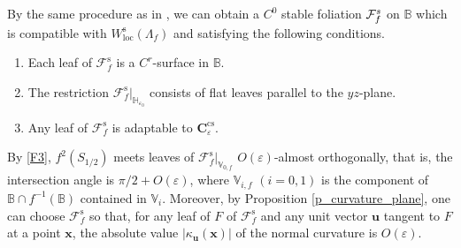\documentclass{amsart}
\theoremstyle{definition}
\numberwithin{equation}{section}
\numberwithin{figure}{section}
\def\smfd{W^{\mathrm{s}}}
\begin{document}
By the same procedure as in \cite[Subsection 2.4]{PT93},
we can obtain a  
$C^{0}$ stable foliation $\mathcal{F}^{\rm s}_{f}\index{Ffs@$\mathcal{F}^{\rm s}_{f}$}$ on $\mathbb{B}$ 
which is compatible with $\smfd_{\mathrm{loc}}(\Lambda_{f})$ and satisfying the following conditions.
\begin{enumerate}[({F}1)]
\makeatletter
\renewcommand{\p@enumi}{F}
\makeatother
\item
Each leaf of $\mathcal{F}_f^{\mathrm{s}}$ is a $C^r$-surface in $\mathbb{B}$.\label{F1}
\item
The restriction $\mathcal{F}_f^{\mathrm{s}}|_{\mathbb{H}_{\varepsilon_0}}$ consists of flat leaves parallel to the $yz$-plane.\label{F2}
\item
Any leaf of $\mathcal{F}_f^{\mathrm{s}}$ is adaptable to $\boldsymbol{C}_{\varepsilon}^{\mathrm{cs}}$.\label{F3}
\end{enumerate} 
By \eqref{F3}, $f^2(S_{1/2})$ meets leaves of $\mathcal{F}_f^{\mathrm{s}}|_{\mathbb{V}_{0,f}}$ $O(\varepsilon)$-almost orthogonally, that is, 
the intersection angle is $\pi/2+O(\varepsilon)$, where $\mathbb{V}_{i,f}$  $(i=0,1)$ is the component of $\mathbb{B}\cap f^{-1}(\mathbb{B})$ contained in $\mathbb{V}_i$.
Moreover, by Proposition \ref{p_curvature_plane}, one can choose $\mathcal{F}_f^{\mathrm{s}}$ so that, 
for any leaf of $F$ of $\mathcal{F}_f^{\mathrm{s}}$ and any unit vector $\boldsymbol{u}$ tangent to $F$ 
at a point $\boldsymbol{x}$, the absolute value $|\kappa_{\boldsymbol{u}}(\boldsymbol{x})|$  of 
the normal curvature is $O(\varepsilon)$.   
\end{document}
